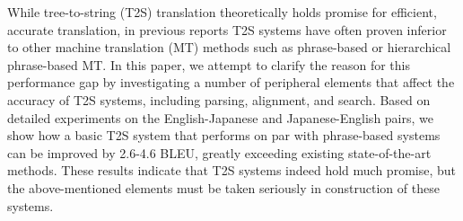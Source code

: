 While tree-to-string (T2S) translation theoretically holds promise for efficient, accurate translation, in previous reports T2S systems have often proven inferior to other machine translation (MT) methods such as phrase-based or hierarchical phrase-based MT. In this paper, we attempt to clarify the reason for this performance gap by investigating a number of peripheral elements that affect the accuracy of T2S systems, including parsing, alignment, and search. Based on detailed experiments on the English-Japanese and Japanese-English pairs, we show how a basic T2S system that performs on par with phrase-based systems can be improved by 2.6-4.6 BLEU, greatly exceeding existing state-of-the-art methods. These results indicate that T2S systems indeed hold much promise, but the above-mentioned elements must be taken seriously in construction of these systems.
